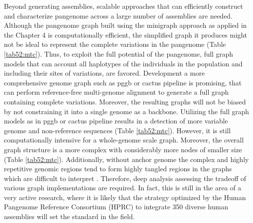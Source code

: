 \documentclass[../main.tex]{subfiles}
\begin{document}
Beyond generating assemblies, scalable approaches that can efficiently construct and characterize pangenome across a large number of assemblies are needed. Although the pangenome graph built using the minigraph approach as applied in the Chapter 4 is computationally efficient, the simplified graph it produces might not be ideal to represent the complete variations in the pangenome (Table \ref{tab52:mtc}). Thus, to exploit the full potential of the pangenome, full graph models that can account all haplotypes of the individuals in the population and including their sites of variations, are favored. Development a more comprehensive genome graph such as pggb or cactus pipeline is promising, that can perform reference-free multi-genome alignment to generate a full graph containing complete variations. Moreover, the resulting graphs will not be biased by not constraining it into a single genome as a backbone. Utilizing the full graph models as in pggb or cactus pipeline results in a detection of more variable genome and non-reference sequences (Table \ref{tab52:mtc}). However, it is still computationally intensive for a whole-genome scale graph. Moreover, the overall graph structure is a more complex with considerably more nodes of smaller size (Table \ref{tab52:mtc}). Additionally, without anchor genome the complex and highly repetitive genomic regions tend to form highly tangled regions in the graphs which are difficult to interpret \citep{lei2021plant}. Therefore, deep analysis assessing the tradeoff of various graph implementations are required. In fact, this is still in the area of a very active research, where it is likely that the strategy optimized by the Human Pangenome Reference Consortium (HPRC) to integrate 350 diverse human assemblies will set the standard in the field. 
\end{document}
